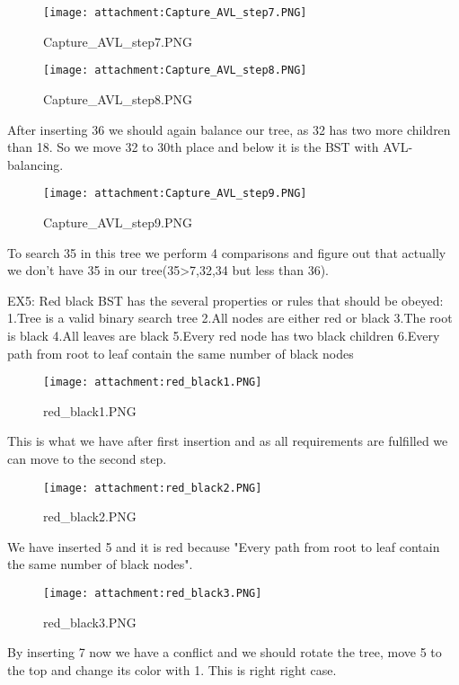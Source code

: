 \documentclass[11pt]{article}
\makeatletter
\def\maxwidth{\ifdim\Gin@nat@width>\linewidth\linewidth
    \else\Gin@nat@width\fi}
\let\Oldincludegraphics\includegraphics
\renewcommand{\includegraphics}[1]{\Oldincludegraphics[width=.8\maxwidth]{#1}}
\makeatother
\begin{document}
    \begin{figure}
\centering
\texttt{[image: attachment:Capture\_AVL\_step7.PNG]}
\caption{Capture\_AVL\_step7.PNG}
\end{figure}

    \begin{figure}
\centering
\texttt{[image: attachment:Capture\_AVL\_step8.PNG]}
\caption{Capture\_AVL\_step8.PNG}
\end{figure}

    After inserting 36 we should again balance our tree, as 32 has two more
children than 18. So we move 32 to 30th place and below it is the BST
with AVL-balancing.

    \begin{figure}
\centering
\texttt{[image: attachment:Capture\_AVL\_step9.PNG]}
\caption{Capture\_AVL\_step9.PNG}
\end{figure}

    To search 35 in this tree we perform 4 comparisons and figure out that
actually we don't have 35 in our tree(35\textgreater{}7,32,34 but less
than 36).

    EX5: Red black BST has the several properties or rules that should be
obeyed: 1.Tree is a valid binary search tree 2.All nodes are either red
or black 3.The root is black 4.All leaves are black 5.Every red node has
two black children 6.Every path from root to leaf contain the same
number of black nodes

    \begin{figure}
\centering
\texttt{[image: attachment:red\_black1.PNG]}
\caption{red\_black1.PNG}
\end{figure}

    This is what we have after first insertion and as all requirements are
fulfilled we can move to the second step.

    \begin{figure}
\centering
\texttt{[image: attachment:red\_black2.PNG]}
\caption{red\_black2.PNG}
\end{figure}

    We have inserted 5 and it is red because "Every path from root to leaf
contain the same number of black nodes".

    \begin{figure}
\centering
\texttt{[image: attachment:red\_black3.PNG]}
\caption{red\_black3.PNG}
\end{figure}

    By inserting 7 now we have a conflict and we should rotate the tree,
move 5 to the top and change its color with 1. This is right right case.
\end{document}
